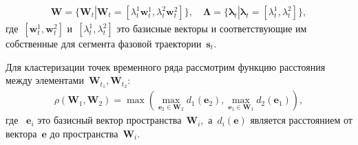 \documentclass[12pt, twoside]{article}
\newtheorem{theorem}{Теорема}
\numberwithin{equation}{section}
\begin{document}
\begin{equation}
\label{eq:cl:3}
\begin{aligned}
\mathbf{W} = \{\textbf{W}_t| \textbf{W}_t = [\lambda^1_t\textbf{w}^1_t, \lambda^2_t\textbf{w}^2_t]\}, \quad \bm{\Lambda} = \{\bm{\lambda}_t| \bm{\lambda}_t=[\lambda^1_t, \lambda^2_t]\},
\end{aligned}
\end{equation}
где~$[\textbf{w}^1_t, \textbf{w}^2_t]$ и~$[\lambda^1_t, \lambda^2_t]$ это базисные векторы и соответствующие им собственные для сегмента фазовой траектории~$\textbf{s}_t$.

Для кластеризации точек временного ряда рассмотрим функцию расстояния между элементами~$\mathbf{W}_{t_1},\mathbf{W}_{t_2}$:
\begin{equation}
\label{eq:cl:4}
\begin{aligned}
\rho\left(\textbf{W}_1, \textbf{W}_2\right) = \max\left(\max_{\textbf{e}_2 \in \textbf{W}_2} d_{1}\left(\textbf{e}_2\right), \max_{\textbf{e}_1 \in \textbf{W}_1} d_{2}\left(\textbf{e}_1\right)\right),
\end{aligned}
\end{equation}
где ~$\textbf{e}_i$ это базисный вектор пространства~$\textbf{W}_i,$ а~$d_i\left(\textbf{e}\right)$ является расстоянием от вектора~$\textbf{e}$ до пространства~$\textbf{W}_i$.

\end{document}
